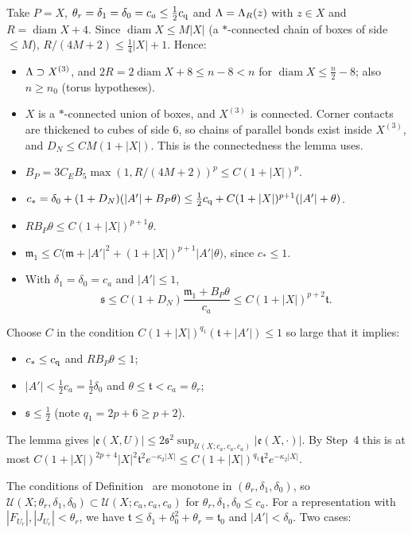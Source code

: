 \begin{detail}
\begin{step}
\end{step}
\begin{step}
Take $P=X$, $\theta_r=\delta_1=\delta_0=c_a\le\frac12c_{\rm q}$ and $\Lambda=\Lambda_R(z)$ with $z\in X$ and $R=\operatorname{diam}X+4$. Since $\operatorname{diam}X\le M|X|$ (a $*$-connected chain of boxes of side $\le M$), $R/(4M+2)\le\frac14|X|+1$. Hence:
\begin{itemize}
\item $\Lambda\supset X^{(3)}$, and $2R=2\operatorname{diam}X+8\le n-8<n$ for $\operatorname{diam}X\le\frac n2-8$; also $n\ge n_0$ (torus hypotheses).
\item $X$ is a $*$-connected union of boxes, and $X^{(3)}$ is connected. Corner contacts are thickened to cubes of side $6$, so chains of parallel bonds exist inside $X^{(3)}$, and $D_N\le CM(1+|X|)$. This is the connectedness the lemma uses.
\item $B_P=3C_EB_5\max(1,R/(4M+2))^p\le C(1+|X|)^p$.
\item $c_*=\delta_0+(1+D_N)(|A'|+B_P\theta)\le\frac12c_{\rm q}+C(1+|X|)^{p+1}(|A'|+\theta)$.
\item $RB_P\theta\le C(1+|X|)^{p+1}\theta$.
\item $\mathfrak m_1\le C\big(\mathfrak m+|A'|^2+(1+|X|)^{p+1}|A'|\theta\big)$, since $c_*\le1$.
\item With $\delta_1=\delta_0=c_a$ and $|A'|\le1$,
\[
\mathfrak s\le C(1+D_N)\frac{\mathfrak m_1+B_P\theta}{c_a}\le C(1+|X|)^{p+2}\mathfrak t .
\]
\end{itemize}
Choose $C$ in the condition $C(1+|X|)^{q_1}(\mathfrak t+|A'|)\le1$ so large that it implies:
\begin{itemize}
\item $c_*\le c_{\rm q}$ and $RB_P\theta\le1$;
\item $|A'|<\frac12c_a=\frac12\delta_0$ and $\theta\le\mathfrak t<c_a=\theta_r$;
\item $\mathfrak s\le\frac12$ (note $q_1=2p+6\ge p+2$).
\end{itemize}
The lemma gives $|\mathfrak e(X,U)|\le2\mathfrak s^2\sup_{\mathcal U(X;c_a,c_a,c_a)}|\mathfrak e(X,\cdot)|$. By Step~4 this is at most $C(1+|X|)^{2p+4}|X|^2\mathfrak t^2e^{-\kappa_2|X|}\le C(1+|X|)^{q_1}\mathfrak t^2e^{-\kappa_2|X|}$.
\end{step}
\begin{step}[(d)]
The conditions of Definition~ are monotone in $(\theta_r,\delta_1,\delta_0)$, so $\mathcal U(X;\theta_r,\delta_1,\delta_0)\subset\mathcal U(X;c_a,c_a,c_a)$ for $\theta_r,\delta_1,\delta_0\le c_a$. For a representation with $|F_{U_r}|,|J_{U_r}|<\theta_r$, we have $\mathfrak t\le\delta_1+\delta_0^2+\theta_r=\mathfrak t_0$ and $|A'|<\delta_0$. Two cases:

\end{step}
\end{detail}
